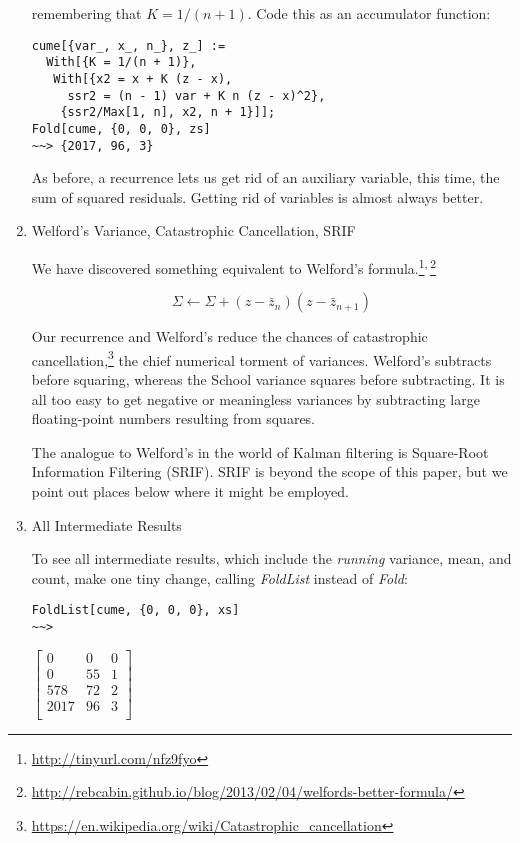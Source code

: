 \documentclass[10pt,oneside,x11names]{article}
\begin{document}
\begin{enumerate}
\noindent remembering that \(K=1/(n+1)\).  Code this as an accumulator function:

\begin{verbatim}
cume[{var_, x_, n_}, z_] :=
  With[{K = 1/(n + 1)},
   With[{x2 = x + K (z - x),
     ssr2 = (n - 1) var + K n (z - x)^2},
    {ssr2/Max[1, n], x2, n + 1}]];
Fold[cume, {0, 0, 0}, zs]
~~> {2017, 96, 3}
\end{verbatim}

As before, a recurrence lets us get rid of an auxiliary variable, this time, the
sum of squared residuals. Getting rid of variables is almost always better.

\item Welford's Variance, Catastrophic Cancellation, SRIF
\label{sec:orgheadline9}

We have discovered something equivalent to Welford's
formula.\footnote{\url{http://tinyurl.com/nfz9fyo}}\textsuperscript{,}\,\footnote{\url{http://rebcabin.github.io/blog/2013/02/04/welfords-better-formula/}}

\begin{equation}
\Sigma \leftarrow \Sigma + (z-\bar{z}_n)(z-\bar{z}_{n+1})
\end{equation}

Our recurrence and Welford's reduce the chances of catastrophic
cancellation,\footnote{\url{https://en.wikipedia.org/wiki/Catastrophic_cancellation}} the chief numerical torment of variances. Welford's
subtracts before squaring, whereas the School variance squares before
subtracting. It is all too easy to get negative or meaningless variances by
subtracting large floating-point numbers resulting from squares.

The analogue to Welford's in the world of Kalman filtering is Square-Root
Information Filtering (SRIF).\footnotemark[4]{} SRIF is beyond the scope of this paper,
but we point out places below where it might be employed.

\item All Intermediate Results
\label{sec:orgheadline10}

To see all intermediate results, which include the \emph{running}
variance, mean, and count,  make one tiny change, calling
\emph{FoldList} instead of \emph{Fold}:

\begin{verbatim}
FoldList[cume, {0, 0, 0}, xs]
~~>
\end{verbatim}
$\begin{bmatrix}
 0 & 0 & 0 \\
 0 & 55 & 1 \\
 578 & 72 & 2 \\
 2017 & 96 & 3 \\
\end{bmatrix}$


\end{enumerate}
\end{document}
